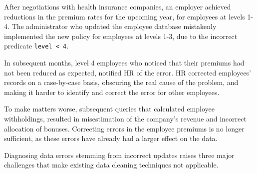 \begin{example}
    After negotiations with health insurance companies, an employer achieved
    reductions in the premium rates for the upcoming year, for employees at
    levels 1-4. The administrator who updated the employee database mistakenly
    implemented the new policy for employees at levels 1-3, due to the
    incorrect predicate \texttt{level < 4}.
    
    In subsequent months, level 4 employees who noticed that their premiums
    had not been reduced as expected, notified HR of the error. HR corrected
    employees' records on a case-by-case basis, obscuring the real cause of
    the problem, and making it harder to identify and correct the error for
    other employees.
    
    To make matters worse, subsequent queries that calculated employee
    withholdings, resulted in misestimation of the company's revenue and
    incorrect allocation of bonuses. Correcting errors in the employee
    premiums is no longer sufficient, as these errors have already had a
    larger effect on the data.
    
\end{example}


Diagnosing data errors stemming from incorrect updates raises three major
challenges that make existing data cleaning techniques not applicable.


